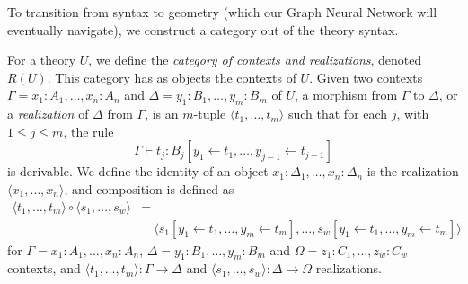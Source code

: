 To transition from syntax to geometry (which our Graph Neural Network will eventually navigate),
we construct a category out of the theory syntax.

\begin{definition}
    For a theory $U$, we define the \textit{category of contexts and realizations},
    denoted $R(U)$.
    This category has as objects the contexts of $U$.
    Given two contexts $\Gamma = x_1 \colon A_1, \dots, x_n \colon A_n$ and 
    $\Delta = y_1 \colon B_1, \dots, y_m \colon B_m$ of $U$, a morphism from $\Gamma$ to $\Delta$,
    or a \textit{realization} of $\Delta$ from $\Gamma$, is an $m$-tuple $\langle t_1, \dots, t_m \rangle$ 
    such that for each $j$, with $1 \leq j \leq m$, the rule 
    \[
        \Gamma \vdash t_j \colon B_j[y_1  \leftarrow  t_1, \dots, y_{j-1}  \leftarrow  t_{j-1}] 
    \]
    is derivable.
    We define the identity of an object $x_1 \colon \Delta_1, \dots, x_n \colon \Delta_n$ is the realization 
    $\langle x_1, \dots, x_n \rangle$, and composition is defined as 
    \begin{align*}
        \langle t_1, \dots, t_m \rangle \circ \langle s_1, \dots, s_w \rangle &= \\
        &\quad \langle s_1[y_1 \leftarrow t_1, \dots, y_m \leftarrow t_m], \dots, s_w[y_1 \leftarrow t_1, \dots, y_m \leftarrow t_m] \rangle
    \end{align*}
    for $\Gamma = x_1 \colon A_1, \dots, x_n \colon A_n$, $\Delta = y_1 \colon B_1, \dots, y_m \colon B_m$
    and $\Omega = z_1 \colon C_1, \dots,  z_w \colon C_w$ contexts, and 
    $\langle t_1, \dots, t_m \rangle \colon \Gamma \to \Delta$ and $\langle s_1, \dots, s_w \rangle \colon \Delta \to \Omega$
    realizations.
\end{definition}

